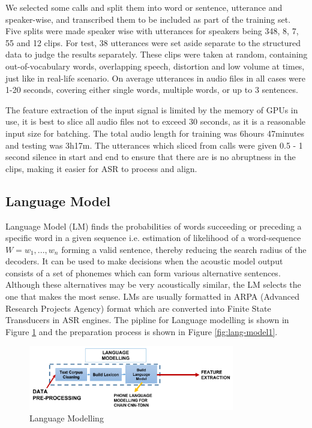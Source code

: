 \documentclass[lettersize,journal]{IEEEtran}
\begin{document}
We selected some calls and split them into word or sentence, utterance and speaker-wise, and transcribed them to be included as part of the training set. Five splits were made speaker wise with utterances for speakers being 348, 8, 7, 55 and 12 clips. For test, 38 utterances were set aside separate to the structured data to judge the results separately. These clips were taken at random, containing out-of-vocabulary words, overlapping speech, distortion and low volume at times, just like in real-life scenario. On average utterances in audio files in all cases were 1-20 seconds, covering either single words, multiple words, or up to 3 sentences.

 
The feature extraction of the input signal is limited by the memory of GPUs in use, it is best to slice all audio files not to exceed 30 seconds, as it is a reasonable input size for batching. The total audio length for training was 6hours 47minutes and testing was 3h17m. The utterances which sliced from calls were given 0.5 - 1 second silence in start and end to ensure that there are is no abruptness in the clips, making it easier for ASR to process and align.

\subsection{Language Model}
\label{sec:our_lang_modelling}

Language Model (LM) finds the probabilities of words succeeding or preceding a specific word in a given sequence i.e. estimation of likelihood of a word-sequence $W = w_{1},...,w_{n}$ forming a valid sentence, thereby reducing the search radius of the decoders. It can be used to make decisions when the acoustic model output consists of a set of phonemes which can form various alternative sentences. Although these alternatives may be very acoustically similar, the LM selects the one that makes the most sense. LMs are usually formatted in ARPA (Advanced Research Projects Agency) format which are converted into Finite State Transducers in ASR engines. The pipline for Language modelling is shown in Figure \ref{fig:working_pipeline-2} and the preparation process is shown in Figure \ref{fig:lang-model1}. 

\begin{figure}[h]
    \centering
    \includegraphics[width=0.8\textwidth]{img/workflow-2.png}
    \caption{Language Modelling}
    \label{fig:working_pipeline-2}
\end{figure}
\end{document}
